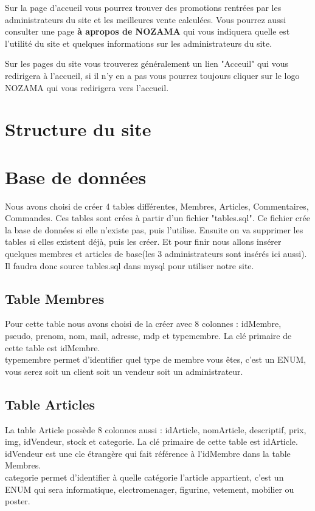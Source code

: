 \documentclass[11pt,a4paper]{article}
\begin{document}
	Sur la page d'accueil vous pourrez trouver des promotions rentr\'ees par les administrateurs du site et les meilleures vente calcul\'ees. Vous pourrez aussi consulter une page \textbf{\`a apropos de NOZAMA} qui vous indiquera quelle est l'utilit\'e du site et quelques informations sur les administrateurs du site.
	
	Sur les pages du site vous trouverez g\'en\'eralement un lien "Acceuil" qui vous redirigera \`a l'accueil, si il n'y en a pas vous pourrez toujours cliquer sur le logo NOZAMA qui vous redirigera vers l'accueil.
	
	\section{Structure du site}
	
	
	\section{Base de donn\'ees}
	
	Nous avons choisi de cr\'eer 4 tables diff\'erentes, Membres, Articles, Commentaires, Commandes. Ces tables sont cr\'ees \`a partir d'un fichier "tables.sql". Ce fichier cr\'ee la base de donn\'ees si elle n'existe pas, puis l'utilise. Ensuite on va supprimer les tables si elles existent d\'ej\`a, puis les cr\'eer. Et pour finir nous allons ins\'erer quelques membres et articles de base(les 3 administrateurs sont ins\'er\'es ici aussi). Il faudra donc source tables.sql dans mysql pour utiliser notre site.
	
	\subsection{Table Membres}
	
	Pour cette table nous avons choisi de la cr\'eer avec 8 colonnes : idMembre, pseudo, prenom, nom, mail, adresse, mdp et typemembre. La cl\'e primaire de cette table est idMembre.
	\\
	typemembre permet d'identifier quel type de membre vous \^etes, c'est un ENUM, vous serez soit un client soit un vendeur soit un administrateur.
	
	
	\subsection{Table Articles}
	
	La table Article poss\`ede 8 colonnes aussi : idArticle, nomArticle, descriptif, prix, img, idVendeur, stock et categorie.
	La cl\'e primaire de cette table est idArticle.\\
	idVendeur est une cle \'etrang\`ere qui fait r\'ef\'erence \`a l'idMembre dans la table Membres.\\
	categorie permet d'identifier \`a quelle cat\'egorie l'article appartient, c'est un ENUM qui sera informatique, electromenager, figurine, vetement, mobilier ou poster.
	
\end{document}
